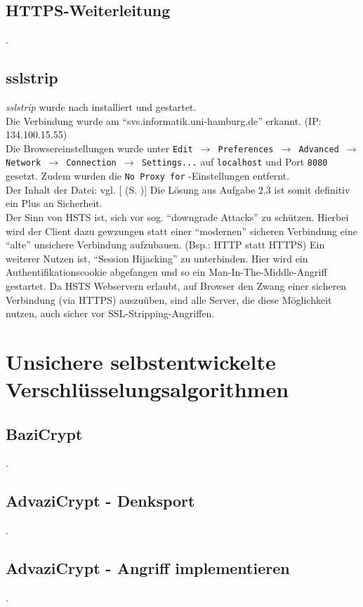\documentclass[twoside]{article}
\newcommand{\ttt}[1]{%
	\texttt{#1}%
}
\newcommand{\mref}[1]{[\nameref{#1} (S. \pageref{#1})]}
\begin{document}
	\subsection{HTTPS-Weiterleitung}
		\label{ssec:https}
		.
	\subsection{sslstrip}
		\label{ssec:sslstrip}
		\textit{sslstrip} wurde nach \cite{sslstrip} installiert und gestartet.\\
		Die Verbindung wurde am ``svs.informatik.uni-hamburg.de'' erkannt. (IP: 134.100.15.55)\\
		Die Browsereinstellungen wurde unter \ttt{Edit $\rightarrow$ Preferences $\rightarrow$ Advanced $\rightarrow$ Network $\rightarrow$ Connection $\rightarrow$ Settings...} auf \ttt{localhost} und Port \ttt{8080} gesetzt.
		Zudem wurden die \ttt{No Proxy for}-Einstellungen entfernt.\\
		Der Inhalt der Datei: vgl. \mref{ssllog}
		Die Lösung aus Aufgabe 2.3 ist somit definitiv ein Plus an Sicherheit.\\
		Der Sinn von HSTS ist, sich vor sog. ``downgrade Attacks'' zu schützen.
		Hierbei wird der Client dazu gewzungen statt einer ``modernen'' sicheren Verbindung eine ``alte'' unsichere Verbindung aufzubauen. (Bsp.: HTTP statt HTTPS)
		Ein weiterer Nutzen ist, ``Session Hijacking'' zu unterbinden.
		Hier wird ein Authentifikationscookie abgefangen und so ein Man-In-The-Middle-Angriff gestartet.
		Da HSTS Webservern erlaubt, auf Browser den Zwang einer sicheren Verbindung (via HTTPS) auszuüben, sind alle Server, die diese Möglichkeit nutzen, auch sicher vor SSL-Stripping-Angriffen.
		
\section{Unsichere selbstentwickelte Verschlüsselungsalgorithmen}
	\label{sec:encrypt}
	\subsection{BaziCrypt}
		\label{ssec:bazi}
		.
	\subsection{AdvaziCrypt - Denksport}
		\label{ssec:advazi}
		.
	\subsection{AdvaziCrypt - Angriff implementieren}
		\label{ssec:advazi2}
		.
		
\end{document}
